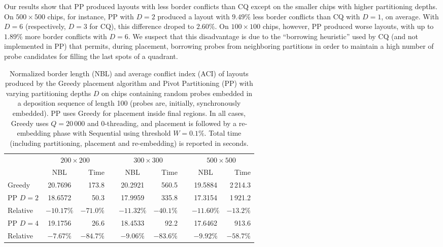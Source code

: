 Our results show that PP produced layouts with less border conflicts than CQ
except on the smaller chips with higher partitioning depths. On $500\times 500$
chips, for instance, PP with $D=2$ produced a layout with $9.49\%$ less border
conflicts than CQ with $D=1$, on average. With $D=6$ (respectively, $D=3$ for
CQ), this difference droped to $2.60\%$. On $100\times 100$ chips, however, PP
produced worse layouts, with up to $1.89\%$ more border conflicts with $D=6$.
We suspect that this disadvantage is due to the ``borrowing heuristic'' used by
CQ (and not implemented in PP) that permits, during placement, borrowing probes
from neighboring partitions in order to maintain a high number of probe
candidates for filling the last spots of a quadrant.

\begin{table}[t!]\centering
\caption{\label{tab:pp_sync}
  Normalized border length (NBL) and average conflict index (ACI) of layouts
  produced by the Greedy placement algorithm and Pivot Partitioning (PP) with
  varying partitioning depths $D$ on chips containing random probes embedded in
  a deposition sequence of length 100 (probes are, initially, synchronously
  embedded). PP uses Greedy for placement inside final regions. In all cases,
  Greedy uses $Q=20\,000$ and $0$-threading, and placement is followed by a
  re-embedding phase with Sequential using threshold $W=0.1\%$. Total time
  (including partitioning, placement and re-embedding) is reported in seconds.}
\footnotesize{
\begin{tabular}{lcrlcrlcr}
\vspace{1pt}
 & \multicolumn{2}{c}{$200\times 200$} & & \multicolumn{2}{c}{$300\times 300$} & & \multicolumn{2}{c}{$500\times 500$} \\
\cline{2-3} \cline{5-6} \cline{8-9}
\vspace{1pt}
         & NBL      & Time    & & NBL      & Time    & & NBL      & Time       \\
\hline
Greedy   &  20.7696 & 173.8   & &  20.2921 & 560.5   & &  19.5884 & 2\,214.3   \\
\hline
PP $D=2$ &  18.6572 &  50.3   & &  17.9959 & 335.8   & &  17.3154 & 1\,921.2   \\
Relative &$-10.17\%$&$-71.0\%$& &$-11.32\%$&$-40.1\%$& &$-11.60\%$&   $-13.2\%$\\
\hline
PP $D=4$ &  19.1756 &  26.6   & &  18.4533 &  92.2   & &  17.6462 &    913.6   \\
Relative & $-7.67\%$&$-84.7\%$& & $-9.06\%$&$-83.6\%$& & $-9.92\%$&   $-58.7\%$\\

\end{tabular}}
\end{table}
